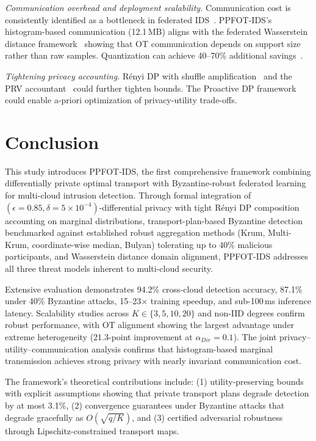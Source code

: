 \documentclass{ieeeaccess}
\theoremstyle{plain}
\theoremstyle{definition}
\theoremstyle{remark}
\begin{document}
\textit{Communication overhead and deployment scalability.} Communication cost is consistently identified as a bottleneck in federated IDS~\cite{feddbn2024}. PPFOT-IDS's histogram-based communication (12.1\,MB) aligns with the federated Wasserstein distance framework~\cite{fedwad2024} showing that OT communication depends on support size rather than raw samples. Quantization can achieve 40--70\% additional savings~\cite{flsurvey2025}.

\textit{Tightening privacy accounting.} R\'{e}nyi DP with shuffle amplification~\cite{chen2024rdp} and the PRV accountant~\cite{gopi2021} could further tighten bounds. The Proactive DP framework~\cite{vandijk2024} could enable a-priori optimization of privacy-utility trade-offs.


\section{Conclusion}
\label{sec:conclusion}

This study introduces PPFOT-IDS, the first comprehensive framework combining differentially private optimal transport with Byzantine-robust federated learning for multi-cloud intrusion detection. Through formal integration of $(\epsilon = 0.85, \delta = 5 \times 10^{-4})$-differential privacy with tight R\'{e}nyi DP composition accounting on marginal distributions, transport-plan-based Byzantine detection benchmarked against established robust aggregation methods (Krum, Multi-Krum, coordinate-wise median, Bulyan) tolerating up to 40\% malicious participants, and Wasserstein distance domain alignment, PPFOT-IDS addresses all three threat models inherent to multi-cloud security.

Extensive evaluation demonstrates 94.2\% cross-cloud detection accuracy, 87.1\% under 40\% Byzantine attacks, 15--23$\times$ training speedup, and sub-100\,ms inference latency. Scalability studies across $K \in \{3, 5, 10, 20\}$ and non-IID degrees confirm robust performance, with OT alignment showing the largest advantage under extreme heterogeneity (21.3-point improvement at $\alpha_{Dir} = 0.1$). The joint privacy--utility--communication analysis confirms that histogram-based marginal transmission achieves strong privacy with nearly invariant communication cost.

The framework's theoretical contributions include: (1) utility-preserving bounds with explicit assumptions showing that private transport plans degrade detection by at most 3.1\%, (2) convergence guarantees under Byzantine attacks that degrade gracefully as $O(\sqrt{q/K})$, and (3) certified adversarial robustness through Lipschitz-constrained transport maps.
\end{document}
